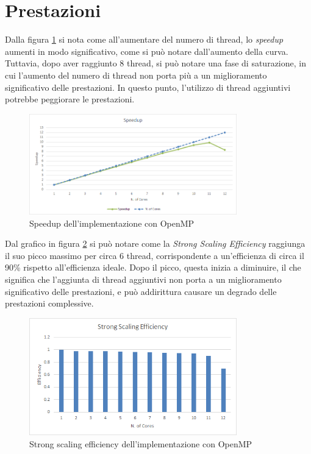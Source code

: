 \documentclass[a4paper, 12pt]{report}
\begin{document}
\section*{Prestazioni}
\begin{sloppypar}
  \noindent
  Dalla figura \ref{fig:omp_speedup} si nota come all'aumentare del numero di thread, lo \textit{speedup} aumenti in modo significativo,
  come si può notare dall'aumento della curva. Tuttavia, dopo aver raggiunto 8 thread, si può notare una fase di 
  saturazione, in cui l'aumento del numero di thread non porta più 
  a un miglioramento significativo delle prestazioni. In questo punto, l'utilizzo di thread aggiuntivi potrebbe 
  peggiorare le prestazioni. 

  \begin{figure}[ht]
    \centering
    \includegraphics[width=9cm]{img/omp-speedup.png}
    \caption{Speedup dell'implementazione con OpenMP}
    \label{fig:omp_speedup}
  \end{figure}

  \noindent
  Dal grafico in figura \ref{fig:omp_sse} si può notare come la \textit{Strong Scaling Efficiency} raggiunga
  il suo picco massimo per circa 6 thread, corrispondente a un'efficienza di circa il 90\% rispetto 
  all'efficienza ideale. Dopo il picco, questa inizia a diminuire, il che significa 
  che l'aggiunta di thread aggiuntivi non porta a un miglioramento significativo delle prestazioni, 
  e può addirittura causare un degrado delle prestazioni complessive.

  \begin{figure}[ht]
    \centering
    \includegraphics[width=9cm]{img/omp-sse.png}
    \caption{Strong scaling efficiency dell'implementazione con OpenMP}
    \label{fig:omp_sse}
  \end{figure}


\end{sloppypar}
\end{document}
